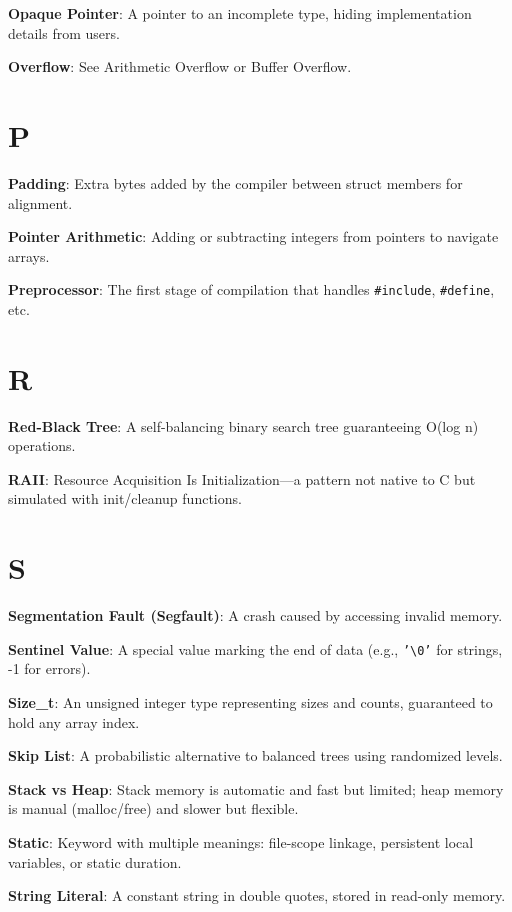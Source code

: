 \documentclass[10pt,openany]{book}
\begin{document}
\textbf{Opaque Pointer}: A pointer to an incomplete type, hiding implementation details from users.

\textbf{Overflow}: See Arithmetic Overflow or Buffer Overflow.

\section*{P}

\textbf{Padding}: Extra bytes added by the compiler between struct members for alignment.

\textbf{Pointer Arithmetic}: Adding or subtracting integers from pointers to navigate arrays.

\textbf{Preprocessor}: The first stage of compilation that handles \texttt{\#include}, \texttt{\#define}, etc.

\section*{R}

\textbf{Red-Black Tree}: A self-balancing binary search tree guaranteeing O(log n) operations.

\textbf{RAII}: Resource Acquisition Is Initialization—a pattern not native to C but simulated with init/cleanup functions.

\section*{S}

\textbf{Segmentation Fault (Segfault)}: A crash caused by accessing invalid memory.

\textbf{Sentinel Value}: A special value marking the end of data (e.g., \texttt{'\textbackslash0'} for strings, -1 for errors).

\textbf{Size\_t}: An unsigned integer type representing sizes and counts, guaranteed to hold any array index.

\textbf{Skip List}: A probabilistic alternative to balanced trees using randomized levels.

\textbf{Stack vs Heap}: Stack memory is automatic and fast but limited; heap memory is manual (malloc/free) and slower but flexible.

\textbf{Static}: Keyword with multiple meanings: file-scope linkage, persistent local variables, or static duration.

\textbf{String Literal}: A constant string in double quotes, stored in read-only memory.
\end{document}
